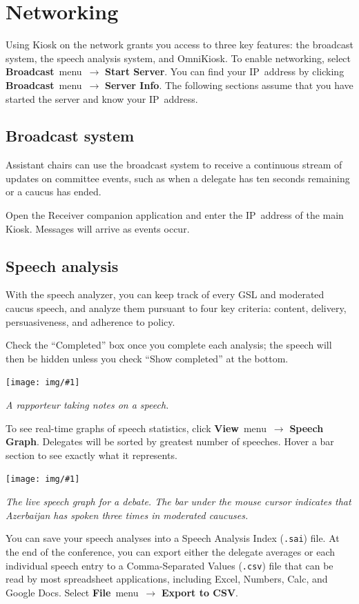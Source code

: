 \documentclass{article}
\newcommand{\navstep}[2]{\navitem{#1}~{#2}~$\rightarrow$}
\newcommand{\navitem}[1]{\textbf{#1}}
\newcommand{\encouragebreak}[1]{\vfil\penalty-#1\vfilneg}
\newcommand{\img}[2]{%
  \begin{center}
    \vspace{6pt}
    \encouragebreak{100}
    \centerline{\texttt{[image: img/\#1]}}
    {\slshape #2}
    \encouragebreak{300}
  \end{center}
}
\begin{document}
\section{Networking}

Using Kiosk on the network grants you access to three key features: the broadcast system, the speech analysis system, and OmniKiosk.
To enable networking, select \navstep{Broadcast}{menu} \navitem{Start Server}.
You can find your IP~address by clicking \navstep{Broadcast}{menu} \navitem{Server Info}.
The following sections assume that you have started the server and know your IP~address.

\subsection{Broadcast system}

Assistant chairs can use the broadcast system to receive a continuous stream of updates on committee events, such as when a delegate has ten seconds remaining or a caucus has ended.

Open the Receiver companion application and enter the IP~address of the main Kiosk.
Messages will arrive as events occur.

\subsection{Speech analysis}

With the speech analyzer, you can keep track of every GSL and moderated caucus speech, and analyze them pursuant to four key criteria: content, delivery, persuasiveness, and adherence to policy.

Check the ``Completed'' box once you complete each analysis; the speech will then be hidden unless you check ``Show completed'' at the bottom.

\img{analyzer_edit}{A rapporteur taking notes on a speech.}

To see real-time graphs of speech statistics, click \navstep{View}{menu} \navitem{Speech Graph}.
Delegates will be sorted by greatest number of speeches.
Hover a bar section to see exactly what it represents.

\img{analyzer_graph}{%
  The live speech graph for a debate. 
  The bar under the mouse cursor indicates that Azerbaijan has spoken three times in moderated caucuses.
}

You can save your speech analyses into a Speech Analysis Index (\texttt{.sai}) file.
At the end of the conference, you can export either the delegate averages or each individual speech entry to a Comma-Separated Values (\texttt{.csv}) file that can be read by most spreadsheet applications, including Excel, Numbers, Calc, and Google Docs.
Select \navstep{File}{menu} \navitem{Export to CSV}.
\end{document}
